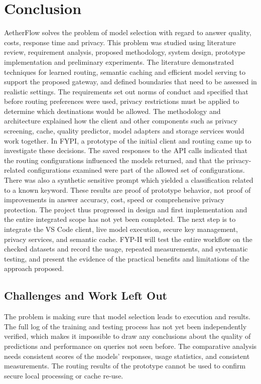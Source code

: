 \chapter{Conclusion}
\label{ch:conclusions}

AetherFlow solves the problem of model selection with regard to answer quality, costs, response time and privacy. This problem was studied using literature review, requirement analysis, proposed methodology, system design, prototype implementation and preliminary experiments. The literature demonstrated techniques for learned routing, semantic caching and efficient model serving to support the proposed gateway, and defined boundaries that need to be assessed in realistic settings. The requirements set out norms of conduct and specified that before routing preferences were used, privacy restrictions must be applied to determine which destinations would be allowed. The methodology and architecture explained how the client and other components such as privacy screening, cache, quality predictor, model adapters and storage services would work together. In FYPI, a prototype of the initial client and routing came up to investigate these decisions. The saved responses to the API calls indicated that the routing configurations influenced the models returned, and that the privacy-related configurations examined were part of the allowed set of configurations. There was also a synthetic sensitive prompt which yielded a classification related to a known keyword. These results are proof of prototype behavior, not proof of improvements in answer accuracy, cost, speed or comprehensive privacy protection. The project thus progressed in design and first implementation and the entire integrated scope has not yet been completed. The next step is to integrate the VS Code client, live model execution, secure key management, privacy services, and semantic cache. FYP-II will test the entire workflow on the checked datasets and record the usage, repeated measurements, and systematic testing, and present the evidence of the practical benefits and limitations of the approach proposed.

\section{Challenges and Work Left Out}
The problem is making sure that model selection leads to execution and results. The full log of the training and testing process has not yet been independently verified, which makes it impossible to draw any conclusions about the quality of predictions and performance on queries not seen before. The comparative analysis needs consistent scores of the models' responses, usage statistics, and consistent measurements. The routing results of the prototype cannot be used to confirm secure local processing or cache re-use.

